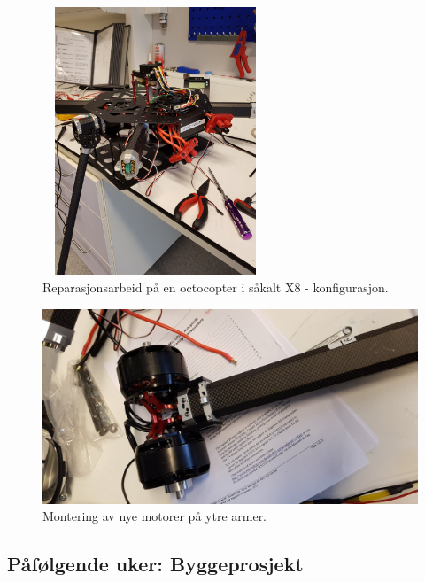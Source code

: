 \documentclass[12pt, a4paper]{article}
\begin{document}
\begin{figure}[ht]
	\centering
	\includegraphics[height = 8cm, width = 0.6\textwidth]{bilder/octocopt_x8.jpg}
	\caption[Reparasjonsarbeid]{Reparasjonsarbeid på en octocopter i såkalt X8 - konfigurasjon.}
\end{figure}
\begin{figure}[ht]
	\centering
	\includegraphics[scale=.2]{bilder/octarm_x8.jpg}
	\caption[Motormontering]{Montering av nye motorer på ytre armer.}
\end{figure}

\subsection{Påfølgende uker: Byggeprosjekt}
\end{document}
